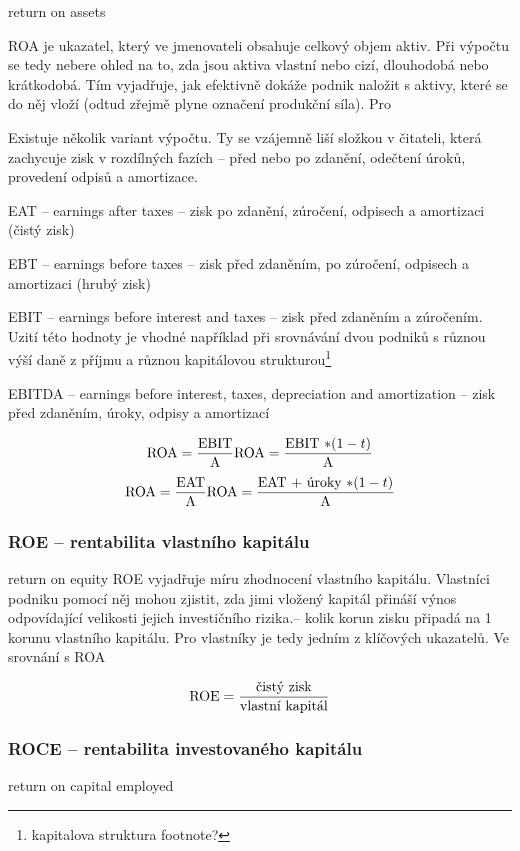 return on assets

ROA je ukazatel, který ve jmenovateli obsahuje celkový objem aktiv. Při výpočtu se tedy nebere ohled na to, zda jsou aktiva vlastní nebo cizí, dlouhodobá nebo krátkodobá. Tím vyjadřuje, jak efektivně dokáže podnik naložit s aktivy, které se do něj vloží (odtud zřejmě plyne označení produkční síla). Pro 

Existuje několik variant výpočtu. Ty se vzájemně liší složkou v čitateli, která zachycuje zisk v rozdílných fazích -- před nebo po zdanění, odečtení úroků, provedení odpisů a amortizace.

EAT -- earnings after taxes -- zisk po zdanění, zúročení, odpisech a amortizaci (čistý zisk)

EBT -- earnings before taxes -- zisk před zdaněním, po zúročení, odpisech a amortizaci (hrubý zisk)

EBIT -- earnings before interest and taxes -- zisk před zdaněním a zúročením. Uzití této hodnoty je vhodné například při srovnávání dvou podniků s různou výší daně z příjmu a různou kapitálovou strukturou\footnote{kapitalova struktura footnote?}

EBITDA -- earnings before interest, taxes, depreciation and amortization -- zisk před zdaněním, úroky, odpisy a amortizací

$$\text{ROA} = \dfrac{\text{EBIT}}{\text{A}}  \text{ROA} = \dfrac{\text{EBIT $*(1-t)$}}{\text{A}}$$ 
$$\text{ROA} = \dfrac{\text{EAT}}{\text{A}}  \text{ROA} = \dfrac{\text{EAT $+$ úroky $*(1-t)$}}{\text{A}}$$



\subsubsection{ROE -- rentabilita vlastního kapitálu}

return on equity
ROE vyjadřuje míru zhodnocení vlastního kapitálu. Vlastníci podniku pomocí něj mohou zjistit, zda jimi vložený kapitál přináší výnos odpovídající velikosti jejich investičního rizika\cite{sedl}.-- kolik korun zisku připadá na 1 korunu vlastního kapitálu. Pro vlastníky je tedy jedním z klíčových ukazatelů. Ve srovnání s ROA

$$\text{ROE} = \dfrac{\text{čistý zisk}}{\text{vlastní kapitál}}$$ 

\subsubsection{ROCE -- rentabilita investovaného kapitálu}

return on capital employed

